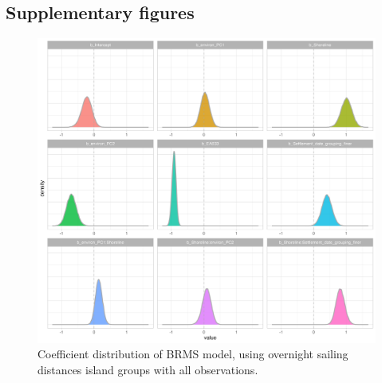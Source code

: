\documentclass[12pt,letterpaper]{article}
\begin{document}
\begin{landscape}

\end{landscape}

\begin{landscape}

\end{landscape}



\newpage
\subsection{Supplementary figures}
\label{appendix_supp_figs}

\begin{figure}[ht]

\includegraphics[width=15cm]{brms_SBZR_group_full_effect_ridge_panels_plot.png}
\caption{Coefficient distribution of BRMS model, using overnight sailing distances island groups with all observations.}
\label{brms_SBZR_group_full_effect_ridge_panels}
\end{figure}
\end{document}
